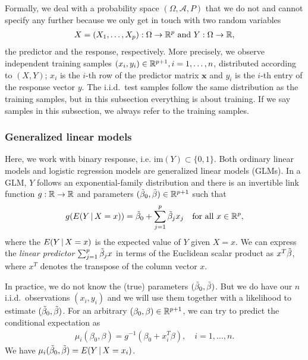 Formally, we deal with a probability space $(\Omega, \mathcal{A}, P)$ that we do not and cannot 
specify any further because we only get in touch with two random variables 
\begin{align}
    X = (X_1, \ldots, X_p): \Omega \to \mathbb{R}^p \text{ and } Y: \Omega \to \mathbb{R},
\end{align}
the predictor and the response, respectively. More 
precisely, we observe independent training samples $(x_i, y_i) \in \mathbb{R}^{p+1}, i = 1, \ldots, n$, 
distributed according to $(X, Y)$; $x_i$ is the $i$-th row of the predictor matrix $\mathbf{x}$ and
$y_i$ is the $i$-th entry of the response vector $y$. The i.i.d.\ test samples follow the same 
distribution as the training samples, but in this subsection everything is about training. If we 
say samples in this subsection, we always refer to the training samples.

\subsubsection{Generalized linear models}\label{subsubsec:glm}

Here, we work with binary response, i.e. $\mathrm{im}(Y) \subset \{0, 1\}$. Both ordinary 
linear models and logistic regression models are generalized linear models (GLMs). In 
a GLM, $Y$ follows an exponential-family distribution and there is an invertible link function 
$g: \mathbb{R} \to \mathbb{R}$ and parameters $(\tilde{\beta}_0, \tilde{\beta}) \in \mathbb{R}^{p+1}$ such that
\begin{align}
    g(E(Y \,|\, X = x)) = \tilde{\beta}_0 + \sum_{j=1}^p \tilde{\beta}_j x_j \quad \text{for all } x \in \mathbb{R}^p,
\end{align}
where the $E(Y \,|\, X = x)$ is the expected value of $Y$ given $X = x$. We can express the 
\textit{linear predictor} $\sum_{j=1}^p \tilde{\beta}_j x$ in terms of the Euclidean scalar product 
as $x^T \tilde{\beta}$, where $x^T$ denotes the transpose of the column vector $x$. 

In practice, we do not know the (true) parameters
$(\tilde{\beta}_0, \tilde{\beta})$. But we do have our $n$ i.i.d.\ observations $(x_i, y_i)$
and we will use them together with a likelihood to estimate $(\tilde{\beta}_0, \tilde{\beta})$. For an 
arbitrary $(\beta_0, \beta) \in \mathbb{R}^{p+1}$, we can try to predict the conditional expectation as
\begin{align}\label{eq:glm-mu}
    \mu_i(\beta_0, \beta) = g^{-1}(\beta_0 + x_i^T \beta), \quad i = 1, \ldots, n.
\end{align}
We have $\mu_i(\tilde{\beta}_0, \tilde{\beta}) = E(Y \,|\, X = x_i)$.

